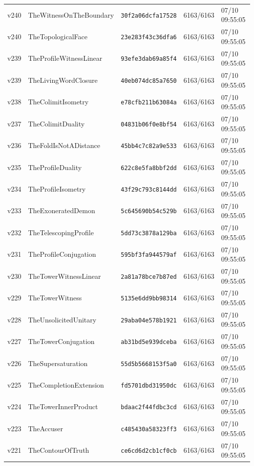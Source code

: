 \documentclass[11pt]{article}
\theoremstyle{definition}\newtheorem{deriv}{Derivação}
\begin{document}
{\begin{longtable}{@{}lllll@{}}
v240 & TheWitnessOnTheBoundary & \texttt{30f2a06dcfa17528} & 6163/6163 & 07/10 09:55:05 \\
v240 & TheTopologicalFace & \texttt{23e283f43c36dfa6} & 6163/6163 & 07/10 09:55:05 \\
v239 & TheProfileWitnessLinear & \texttt{93efe3dab69a85f4} & 6163/6163 & 07/10 09:55:05 \\
v239 & TheLivingWordClosure & \texttt{40eb074dc85a7650} & 6163/6163 & 07/10 09:55:05 \\
v238 & TheColimitIsometry & \texttt{e78cfb211b63084a} & 6163/6163 & 07/10 09:55:05 \\
v237 & TheColimitDuality & \texttt{04831b06f0e8bf54} & 6163/6163 & 07/10 09:55:05 \\
v236 & TheFoldIsNotADistance & \texttt{45bb4c7c82a9e533} & 6163/6163 & 07/10 09:55:05 \\
v235 & TheProfileDuality & \texttt{622c8e5fa8bbf2dd} & 6163/6163 & 07/10 09:55:05 \\
v234 & TheProfileIsometry & \texttt{43f29c793c8144dd} & 6163/6163 & 07/10 09:55:05 \\
v233 & TheExoneratedDemon & \texttt{5c645690b54c529b} & 6163/6163 & 07/10 09:55:05 \\
v232 & TheTelescopingProfile & \texttt{5dd73c3878a129ba} & 6163/6163 & 07/10 09:55:05 \\
v231 & TheProfileConjugation & \texttt{595bf3fa944579af} & 6163/6163 & 07/10 09:55:05 \\
v230 & TheTowerWitnessLinear & \texttt{2a81a78bce7b87ed} & 6163/6163 & 07/10 09:55:05 \\
v229 & TheTowerWitness & \texttt{5135e6dd9bb98314} & 6163/6163 & 07/10 09:55:05 \\
v228 & TheUnsolicitedUnitary & \texttt{29aba04e578b1921} & 6163/6163 & 07/10 09:55:05 \\
v227 & TheTowerConjugation & \texttt{ab31bd5e939dceba} & 6163/6163 & 07/10 09:55:05 \\
v226 & TheSupersaturation & \texttt{55d5b5668153f5a0} & 6163/6163 & 07/10 09:55:05 \\
v225 & TheCompletionExtension & \texttt{fd5701dbd31950dc} & 6163/6163 & 07/10 09:55:05 \\
v224 & TheTowerInnerProduct & \texttt{bdaac2f44fdbc3cd} & 6163/6163 & 07/10 09:55:05 \\
v223 & TheAccuser & \texttt{c485430a58323ff3} & 6163/6163 & 07/10 09:55:05 \\
v221 & TheContourOfTruth & \texttt{ce6cd6d2cb1cf0cb} & 6163/6163 & 07/10 09:55:05 \\

\end{longtable}}
\end{document}
